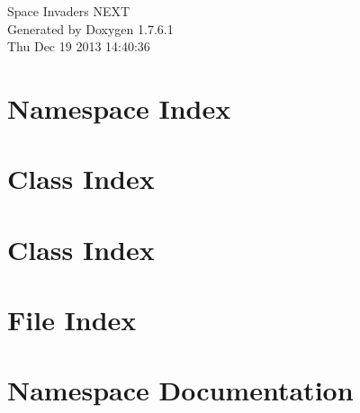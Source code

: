 \documentclass[a4paper]{book}
\begin{document}
\hypersetup{pageanchor=false,citecolor=blue}
\begin{titlepage}
\vspace*{7cm}
\begin{center}
{\Large \-Space \-Invaders \-N\-E\-X\-T }\\
\vspace*{1cm}
{\large \-Generated by Doxygen 1.7.6.1}\\
\vspace*{0.5cm}
{\small Thu Dec 19 2013 14:40:36}\\
\end{center}
\end{titlepage}
\clearemptydoublepage
{}
\tableofcontents
\clearemptydoublepage
{}
\hypersetup{pageanchor=true,citecolor=blue}
\chapter{\-Namespace \-Index}

\chapter{\-Class \-Index}

\chapter{\-Class \-Index}

\chapter{\-File \-Index}

\chapter{\-Namespace \-Documentation}





\end{document}
